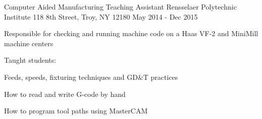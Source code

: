 \begin{cventries}
  \cventry
    {Computer Aided Manufacturing Teaching Assistant} %
    {Rensselaer Polytechnic Institute} %
    {118 8th Street, Troy, NY 12180} %
    {May 2014 - Dec 2015} %
    {
      \begin{cvitems} %
        \item {Responsible for checking and running machine code on a Haas VF-2 and MiniMill machine centers}
        \item {Taught students:\newline}
        \begin{cvsubitems}
        \vspace{0.4cm}
            \item {Feeds, speeds, fixturing techniques and GD\&T practices}
            \item {How to read and write G-code by hand}
            \item {How to program tool paths using MasterCAM}
        \vspace{0.4cm}
        \end{cvsubitems}
      \end{cvitems}
    }
    



\end{cventries}
